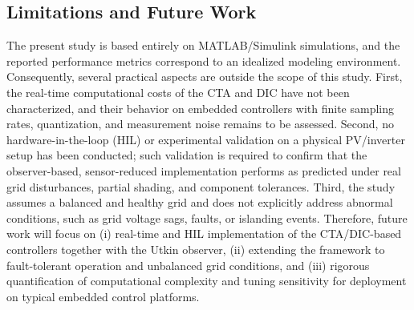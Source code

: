 \documentclass[preprint,12pt]{elsarticle}
\begin{document}
\subsection*{Limitations and Future Work}
The present study is based entirely on MATLAB/Simulink simulations, and the reported performance metrics correspond to an idealized modeling environment. Consequently, several practical aspects are outside the scope of this study. First, the real-time computational costs of the CTA and DIC have not been characterized, and their behavior on embedded controllers with finite sampling rates, quantization, and measurement noise remains to be assessed. Second, no hardware-in-the-loop (HIL) or experimental validation on a physical PV/inverter setup has been conducted; such validation is required to confirm that the observer-based, sensor-reduced implementation performs as predicted under real grid disturbances, partial shading, and component tolerances. Third, the study assumes a balanced and healthy grid and does not explicitly address abnormal conditions, such as grid voltage sags, faults, or islanding events. Therefore, future work will focus on (i) real-time and HIL implementation of the CTA/DIC-based controllers together with the Utkin observer, (ii) extending the framework to fault-tolerant operation and unbalanced grid conditions, and (iii) rigorous quantification of computational complexity and tuning sensitivity for deployment on typical embedded control platforms.
 

    
    
    
\end{document}

